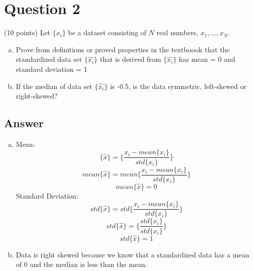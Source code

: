 \documentclass{report}
\begin{document}
\newpage
\section*{Question 2}
(10 points) Let $\{x_i\}$ be a dataset consisting of $N$ real numbers, $x_1,...,x_N$.
\begin{enumerate}[(a)]
    \item Prove from definitions or proved properties in the textboook that the standardized data set $\{\hat{x_i}\}$ that is derived from $\{\hat{x_i}\}$ has mean = 0 and standard deviation = 1
    \item If the median of data set $\{\hat{x_i}\}$ is -0.5, is the data symmetric, left-skewed or right-skewed?
\end{enumerate}

\subsection*{Answer}
\begin{enumerate}[(a)]
    \item Mean:
        $$ \{\hat{x}\}=\{\frac{x_i-mean\{x_i\}}{std\{x_i\}}\} $$
        $$ mean\{\hat{x}\}=mean\{\frac{x_i-mean\{x_i\}}{std\{x_i\}}\}$$
        $$ mean\{\hat{x}\}=0 $$
    Standard Deviation:
        $$ std\{\hat{x}\}=std\{\frac{x_i-mean\{x_i\}}{std\{x_i\}}\}$$
        $$ std\{\hat{x}\}=\{\frac{std\{x_i\}}{std\{x_i\}}\}$$
        $$ std\{\hat{x}\}=1 $$
    \item Data is right skewed because we know that a standardized data has a mean of 0 and the median is less than the mean.
\end{enumerate}

\newpage
\end{document}
